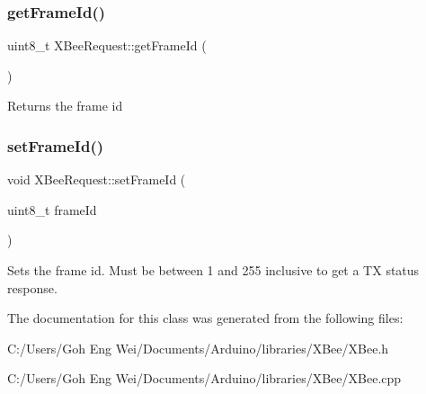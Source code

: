 \hypertarget{class_x_bee_request_a20394c7ea4666224c50bef25cc0cd836}{}\label{class_x_bee_request_a20394c7ea4666224c50bef25cc0cd836} 
\subsubsection{\texorpdfstring{get\+Frame\+Id()}{getFrameId()}}
{\footnotesize\ttfamily uint8\+\_\+t X\+Bee\+Request\+::get\+Frame\+Id (\begin{DoxyParamCaption}{ }\end{DoxyParamCaption})}

Returns the frame id \hypertarget{class_x_bee_request_aed1724c11e710217807c971e40105c86}{}\label{class_x_bee_request_aed1724c11e710217807c971e40105c86} 
\subsubsection{\texorpdfstring{set\+Frame\+Id()}{setFrameId()}}
{\footnotesize\ttfamily void X\+Bee\+Request\+::set\+Frame\+Id (\begin{DoxyParamCaption}\item[{uint8\+\_\+t}]{frame\+Id }\end{DoxyParamCaption})}

Sets the frame id. Must be between 1 and 255 inclusive to get a TX status response. 

The documentation for this class was generated from the following files\+:\begin{DoxyCompactItemize}
\item 
C\+:/\+Users/\+Goh Eng Wei/\+Documents/\+Arduino/libraries/\+X\+Bee/X\+Bee.\+h\item 
C\+:/\+Users/\+Goh Eng Wei/\+Documents/\+Arduino/libraries/\+X\+Bee/X\+Bee.\+cpp\end{DoxyCompactItemize}
